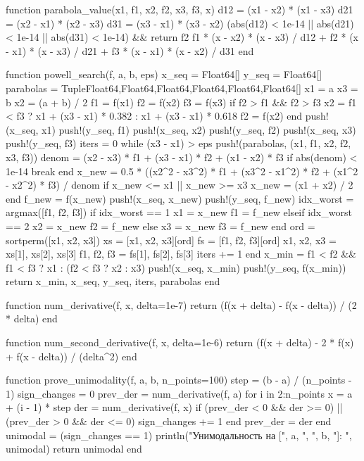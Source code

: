 \documentclass[a4paper, 14pt]{extarticle}
\begin{document}
\begin{breakablelisting}
function parabola_value(x1, f1, x2, f2, x3, f3, x)
    d12 = (x1 - x2) * (x1 - x3)
    d21 = (x2 - x1) * (x2 - x3)
    d31 = (x3 - x1) * (x3 - x2)
    (abs(d12) < 1e-14 || abs(d21) < 1e-14 || abs(d31) < 1e-14) && return f2
    f1 * (x - x2) * (x - x3) / d12 + f2 * (x - x1) * (x - x3) / d21 + f3 * (x - x1) * (x - x2) / d31
end

function powell_search(f, a, b, eps)
    x_seq = Float64[]
    y_seq = Float64[]
    parabolas = Tuple{Float64,Float64,Float64,Float64,Float64,Float64}[]
    x1 = a
    x3 = b
    x2 = (a + b) / 2
    f1 = f(x1)
    f2 = f(x2)
    f3 = f(x3)
    if f2 > f1 && f2 > f3
        x2 = f1 < f3 ? x1 + (x3 - x1) * 0.382 : x1 + (x3 - x1) * 0.618
        f2 = f(x2)
    end
    push!(x_seq, x1)
    push!(y_seq, f1)
    push!(x_seq, x2)
    push!(y_seq, f2)
    push!(x_seq, x3)
    push!(y_seq, f3)
    iters = 0
    while (x3 - x1) > eps
        push!(parabolas, (x1, f1, x2, f2, x3, f3))
        denom = (x2 - x3) * f1 + (x3 - x1) * f2 + (x1 - x2) * f3
        if abs(denom) < 1e-14
            break
        end
        x_new = 0.5 * ((x2^2 - x3^2) * f1 + (x3^2 - x1^2) * f2 + (x1^2 - x2^2) * f3) / denom
        if x_new <= x1 || x_new >= x3
            x_new = (x1 + x2) / 2
        end
        f_new = f(x_new)
        push!(x_seq, x_new)
        push!(y_seq, f_new)
        idx_worst = argmax([f1, f2, f3])
        if idx_worst == 1
            x1 = x_new
            f1 = f_new
        elseif idx_worst == 2
            x2 = x_new
            f2 = f_new
        else
            x3 = x_new
            f3 = f_new
        end
        ord = sortperm([x1, x2, x3])
        xs = [x1, x2, x3][ord]
        fs = [f1, f2, f3][ord]
        x1, x2, x3 = xs[1], xs[2], xs[3]
        f1, f2, f3 = fs[1], fs[2], fs[3]
        iters += 1
    end
    x_min = f1 < f2 && f1 < f3 ? x1 : (f2 < f3 ? x2 : x3)
    push!(x_seq, x_min)
    push!(y_seq, f(x_min))
    return x_min, x_seq, y_seq, iters, parabolas
end

function num_derivative(f, x, delta=1e-7)
    return (f(x + delta) - f(x - delta)) / (2 * delta)
end

function num_second_derivative(f, x, delta=1e-6)
    return (f(x + delta) - 2 * f(x) + f(x - delta)) / (delta^2)
end

function prove_unimodality(f, a, b, n_points=100)
    step = (b - a) / (n_points - 1)
    sign_changes = 0
    prev_der = num_derivative(f, a)
    for i in 2:n_points
        x = a + (i - 1) * step
        der = num_derivative(f, x)
        if (prev_der < 0 && der >= 0) || (prev_der > 0 && der <= 0)
            sign_changes += 1
        end
        prev_der = der
    end
    unimodal = (sign_changes == 1)
    println("Унимодальность на [", a, ", ", b, "]: ", unimodal)
    return unimodal
end


\end{breakablelisting}
\end{document}
